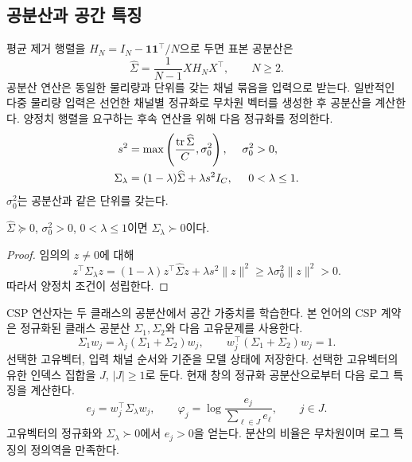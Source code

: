 \subsection{공분산과 공간 특징}
평균 제거 행렬을 $H_N=I_N-\mathbf 1\mathbf 1^\top/N$으로 두면 표본 공분산은
\begin{equation}
 \widehat\Sigma=\frac{1}{N-1}XH_NX^\top,\qquad N\ge2.
\end{equation}
공분산 연산은 동일한 물리량과 단위를 갖는 채널 묶음을 입력으로 받는다.
일반적인 다중 물리량 입력은 선언한 채널별 정규화로 무차원 벡터를 생성한 후 공분산을 계산한다.
양정치 행렬을 요구하는 후속 연산을 위해 다음 정규화를 정의한다.
\begin{equation}
 \begin{aligned}
 s^2&=\max\left(\frac{\operatorname{tr}\widehat\Sigma}{C},\sigma_0^2\right),
       &\sigma_0^2&>0,\\
 \Sigma_\lambda&=(1-\lambda)\widehat\Sigma+\lambda s^2I_C,
       &0&<\lambda\le1.
 \end{aligned}
 \label{eq:spd}
\end{equation}
$\sigma_0^2$는 공분산과 같은 단위를 갖는다.

\begin{proposition}
$\widehat\Sigma\succeq0$, $\sigma_0^2>0$, $0<\lambda\le1$이면
$\Sigma_\lambda\succ0$이다.
\end{proposition}
\begin{proof}
임의의 $z\ne0$에 대해
\[
 z^\top\Sigma_\lambda z
 =(1-\lambda)z^\top\widehat\Sigma z+\lambda s^2\lVert z\rVert^2
 \ge\lambda\sigma_0^2\lVert z\rVert^2>0.
\]
따라서 양정치 조건이 성립한다.
\end{proof}

CSP 연산자는 두 클래스의 공분산에서 공간 가중치를 학습한다\cite{csp}.
본 언어의 CSP 계약은 정규화된 클래스 공분산 $\Sigma_1,\Sigma_2$와 다음 고유문제를 사용한다.
\begin{equation}
 \Sigma_1w_j=\lambda_j(\Sigma_1+\Sigma_2)w_j,
 \qquad w_j^\top(\Sigma_1+\Sigma_2)w_j=1.
\end{equation}
선택한 고유벡터, 입력 채널 순서와 기준을 모델 상태에 저장한다.
선택한 고유벡터의 유한 인덱스 집합을 $J$, $|J|\ge1$로 둔다.
현재 창의 정규화 공분산으로부터 다음 로그 특징을 계산한다.
\begin{equation}
 e_j=w_j^\top\Sigma_\lambda w_j,\qquad
 \varphi_j=\log\frac{e_j}{\sum_{\ell\in J}e_\ell},\qquad j\in J.
 \label{eq:csp-feature}
\end{equation}
고유벡터의 정규화와 $\Sigma_\lambda\succ0$에서 $e_j>0$을 얻는다.
분산의 비율은 무차원이며 로그 특징의 정의역을 만족한다.

